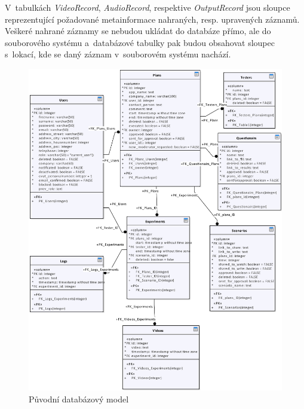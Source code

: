\documentclass[thesis=M,czech]{FITthesis}[2012/06/26]
\begin{document}
V~tabulkách \textit{VideoRecord}, \textit{AudioRecord}, respektive \textit{OutputRecord} jsou sloupce reprezentující požadované metainformace nahraných, resp. upravených záznamů. Veškeré nahrané záznamy se nebudou ukládat do databáze přímo, ale do souborového systému a~databázové tabulky pak budou obsahovat sloupec s~lokací, kde se daný záznam v~souborovém systému nachází.

\begin{figure}[h]\centering
	\includegraphics[width=1\textwidth]{images/db_orig.eps}
	\caption{Původní databázový model}\label{img:navrh_backend_db_orig}
\end{figure}
\end{document}
